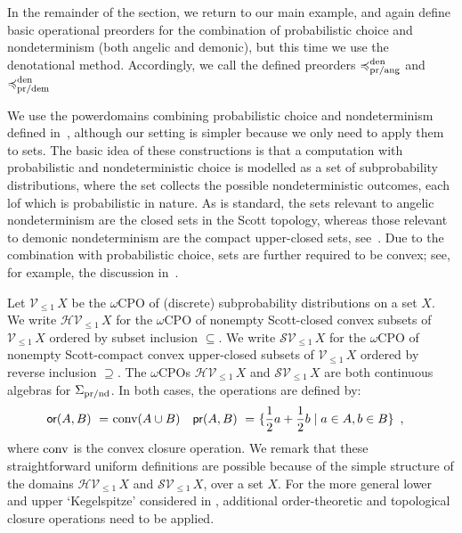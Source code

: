 In the remainder of the section, we return to our main example, and again define basic operational preorders for the combination of probabilistic choice and nondeterminism (both angelic and demonic), but this time we use the denotational method. Accordingly, we call the defined preorders
$\preccurlyeq^{\text{den}}_{\text{pr/ang}}$ and $\preccurlyeq^{\text{den}}_{\text{pr/dem}}$

We use the powerdomains combining probabilistic choice and nondeterminism
defined in~\cite[\S3.4]{KeimelP2016}, although our setting is simpler because we only need to apply them to sets.
The basic idea of these constructions is that a computation with probabilistic and nondeterministic choice is modelled as a set of subprobability distributions, where the set collects the possible nondeterministic outcomes, each lof which is probabilistic in nature. As is standard, 
the sets relevant to angelic nondeterminism are the closed sets in the Scott topology, whereas those relevant to demonic nondeterminism are the compact upper-closed sets, see~\cite{smyth}.
Due to the combination with probabilistic choice,  sets are further required to be convex; see, for example, the discussion in~\cite{KeimelP2016}.



Let $\mathcal{V}_{\leq 1} \,X$ be the $\omega$CPO of (discrete) subprobability distributions on a set $X$.
We write $\mathcal{H}\mathcal{V}_{\leq 1} \,X$ for the $\omega$CPO of nonempty Scott-closed convex subsets
of  $\mathcal{V}_{\leq 1} \,X$  ordered by subset inclusion $\subseteq$. 
We write $\mathcal{S}\mathcal{V}_{\leq 1} \,X$ for the $\omega$CPO of nonempty Scott-compact convex upper-closed subsets
of  $\mathcal{V}_{\leq 1} \,X$  ordered by reverse inclusion $\supseteq$.
The $\omega$CPOs $\mathcal{H}\mathcal{V}_{\leq 1} \,X$ and $\mathcal{S}\mathcal{V}_{\leq 1} \,X$ are both continuous algebras for $\Sigma_{\text{pr/nd}}$. In both cases, the operations are defined by:
\begin{align*}
\operatorname{\textsf{or}}(A,B) ~ = ~ & \text{conv}(A \cup B)  
& 
\operatorname{\textsf{pr}}(A,B) ~ = ~ & \{\frac{1}{2}a + \frac{1}{2}b \mid a \in A, b \in B\} \enspace ,
\end{align*}
where $\text{conv}$ is the convex closure operation. 
We remark that these straightforward uniform definitions are possible because of the simple structure of the 
domains  $\mathcal{H}\mathcal{V}_{\leq 1} \,X$ and $\mathcal{S}\mathcal{V}_{\leq 1} \,X$, over a set $X$. For the more general 
lower and upper `Kegelspitze' considered in \cite{KeimelP2016}, additional order-theoretic and topological closure operations need to be applied.

